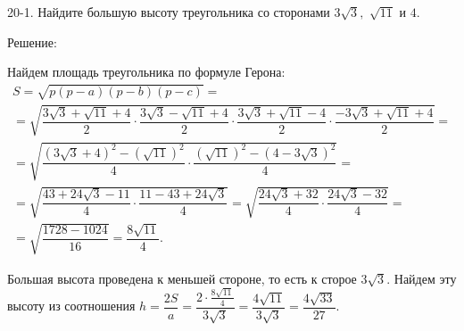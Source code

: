 20-1. Найдите большую высоту треугольника со сторонами $3\sqrt{3},$ $\sqrt{11}$ и $4$.

Решение:

Найдем площадь треугольника по формуле Герона:
\begin{multline*}
S = \sqrt{p(p-a)(p-b)(p-c)} =\\
=\sqrt{\dfrac{3\sqrt{3}+\sqrt{11}+4}{2}\cdot \dfrac{3\sqrt{3}-\sqrt{11}+4}{2}\cdot \dfrac{3\sqrt{3}+\sqrt{11}-4}{2}\cdot \dfrac{-3\sqrt{3}+\sqrt{11}+4}{2}}=\\
=\sqrt{\dfrac{(3\sqrt{3}+4)^2-(\sqrt{11})^2}{4}\cdot \dfrac{(\sqrt{11})^2-(4-3\sqrt{3})^2}{4}}=\\
=\sqrt{\dfrac{43+24\sqrt{3}-11}{4}\cdot \dfrac{11-43+24\sqrt{3}}{4}} =\sqrt{\dfrac{24\sqrt{3}+32}{4}\cdot \dfrac{24\sqrt{3}-32}{4}} =\\= \sqrt{\dfrac{1728-1024}{16}} = \dfrac{8\sqrt{11}}{4}.
\end{multline*}

Большая высота проведена к меньшей стороне, то есть к сторое $3\sqrt{3}$. Найдем эту высоту из соотношения $h=\dfrac{2S}{a} = \dfrac{2\cdot\frac{8\sqrt{11}}{4}}{3\sqrt{3}} = \dfrac{4\sqrt{11}}{3\sqrt{3}} = \dfrac{4\sqrt{33}}{27}.$


